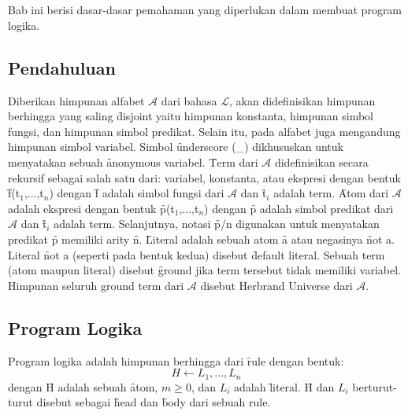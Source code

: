 \chapter{\babDua}
Bab ini berisi dasar-dasar pemahaman yang diperlukan dalam membuat program logika. 
\section{Pendahuluan}
Diberikan himpunan alfabet \( \mathcal{A} \) dari bahasa \( \mathcal{L} \), akan didefinisikan himpunan berhingga yang saling \f{disjoint} yaitu himpunan konstanta, himpunan simbol fungsi, dan himpunan simbol predikat. Selain itu, pada alfabet juga mengandung himpunan simbol variabel. Simbol \f{underscore} (\_) dikhususkan untuk menyatakan sebuah \f{anonymous} variabel. \f{Term} dari \( \mathcal{A} \) didefinisikan secara rekursif sebagai salah satu dari: variabel, konstanta, atau ekspresi dengan bentuk \f{f(t$_{1}$,...,t$_{n}$)} dengan \f{f} adalah simbol fungsi dari \( \mathcal{A} \) dan \f{t$_{i}$} adalah term. \f{Atom} dari \( \mathcal{A} \) adalah ekspresi dengan bentuk \f{p(t$_{1}$,...,t$_{n}$)} dengan \f{p} adalah simbol predikat dari \( \mathcal{A} \) dan \f{t$_{i}$} adalah term. Selanjutnya, notasi \f{p/n} digunakan untuk menyatakan predikat \f{p} memiliki arity \f{n}. \f{Literal} adalah sebuah atom \f{a} atau negasinya \f{not a}. Literal \f{not a} (seperti pada bentuk kedua) disebut \f{default} literal. Sebuah term (atom maupun literal) disebut \f{ground} jika term tersebut tidak memiliki variabel. Himpunan seluruh ground term dari \( \mathcal{A} \) disebut Herbrand Universe dari \( \mathcal{A} \).
\section{Program Logika}\label{cha:kompar}
Program logika adalah himpunan berhingga dari \f{rule} dengan bentuk:
\begin{displaymath}
	H \leftarrow L_1,...,L_n
\end{displaymath}
dengan \f{H} adalah sebuah \f{atom}, $m \geq 0$, dan $L_i$ adalah \f{literal}. \f{H} dan $L_i$ berturut-turut disebut sebagai \f{head} dan \f{body} dari sebuah rule.

